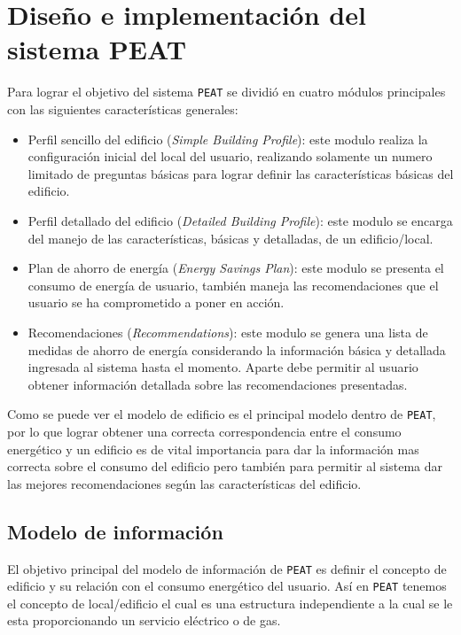 \chapter{Diseño e implementación del sistema PEAT}

Para lograr el objetivo del sistema \texttt{PEAT} se dividió en cuatro
módulos principales con las siguientes características generales:

\begin{itemize}
\item Perfil sencillo del edificio (\textit{Simple Building Profile}): este modulo
  realiza la configuración inicial del local del usuario, realizando solamente
  un numero limitado de preguntas básicas para lograr definir las características
  básicas del edificio.
\item Perfil detallado del edificio (\textit{Detailed Building Profile}):
  este modulo se encarga del manejo de las características, básicas y detalladas,
  de un edificio/local.
\item Plan de ahorro de energía (\textit{Energy Savings Plan}): este modulo se
  presenta el consumo de energía de usuario, también maneja las recomendaciones
  que el usuario se ha comprometido a poner en acción.
\item Recomendaciones (\textit{Recommendations}): este modulo se genera una lista
  de medidas de ahorro de energía considerando la información básica y detallada
  ingresada al sistema hasta el momento. Aparte debe permitir al usuario obtener
  información detallada sobre las recomendaciones presentadas.
\end{itemize}

Como se puede ver el modelo de edificio es el principal modelo dentro de
\texttt{PEAT}, por lo que lograr obtener una correcta correspondencia entre
el consumo energético y un edificio es de vital importancia para dar la
información mas correcta sobre el consumo del edificio pero también para
permitir al sistema dar las mejores recomendaciones según las características
del edificio.

\section{Modelo de información}

El objetivo principal del modelo de información de \texttt{PEAT} es definir el
concepto de edificio y su relación con el consumo energético del usuario. Así en
\texttt{PEAT} tenemos el concepto de local/edificio el cual es una estructura
independiente a la cual se le esta proporcionando un servicio eléctrico o de gas.

